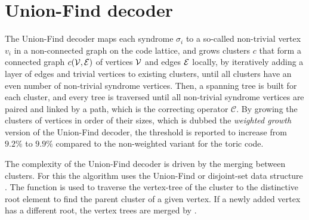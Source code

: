\section{Union-Find decoder}\label{sec:unionfind}

The Union-Find decoder \cite{delfosse2017linear, delfosse2017almost} maps each syndrome $\sigma_i$ to a so-called non-trivial vertex $v_i$ in a non-connected graph on the code lattice, and grows clusters $c$ that form a connected graph $c(\mathcal{V}, \mathcal{E})$ of vertices $\mathcal{V}$ and edges $\mathcal{E}$ locally, by iteratively adding a layer of edges and trivial vertices to existing clusters, until all clusters have an even number of non-trivial syndrome vertices. Then, a spanning tree is built for each cluster, and every tree is traversed until all non-trivial syndrome vertices are paired and linked by a path, which is the correcting operator $\mathcal{C}$. By growing the clusters of vertices in order of their sizes, which is dubbed the \emph{weighted growth} version of the Union-Find decoder, the threshold is reported to increase from $9.2\%$ to $9.9\%$ compared to the non-weighted variant for the toric code. 

The complexity of the Union-Find decoder is driven by the merging between clusters. For this the algorithm uses the Union-Find or disjoint-set data structure \cite{tarjan1975efficiency}. The function  is used to traverse the vertex-tree of the cluster to the distinctive root element to find the parent cluster of a given vertex. If a newly added vertex has a different root, the vertex trees are merged by . 